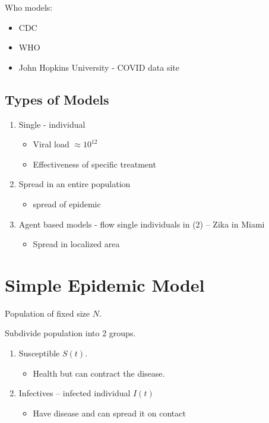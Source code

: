 \documentclass[
	date={October 30{,} 2024},
	month={10},
	day={30}
]{math486notes}
\begin{document}
Who models:
\begin{itemize}
	\item CDC
	\item WHO
	\item John Hopkins University - COVID data site
\end{itemize}

\subsection{Types of Models}\label{subsec:types-of-models}
\begin{enumerate}
	\item Single - individual
	\begin{itemize}
		\item Viral load $\approx10^{12}$
		\item Effectiveness of specific treatment
	\end{itemize}
	\item Spread in an entire population
	\begin{itemize}
		\item spread of epidemic
	\end{itemize}
	\item Agent based models - flow single individuals in (2) -- Zika in Miami
	\begin{itemize}
		\item Spread in localized area
	\end{itemize}
\end{enumerate}

\section{Simple Epidemic Model}\label{sec:simple-epidemic-model}
Population of fixed size $N$.

Subdivide population into 2 groups.

\begin{enumerate}
	\item Susceptible $S(t)$.
	\begin{itemize}
		\item Health but can contract the disease.
	\end{itemize}
	\item Infectives -- infected individual $I(t)$
	\begin{itemize}
		\item Have disease and can spread it on contact
	\end{itemize}
\end{enumerate}
\end{document}
